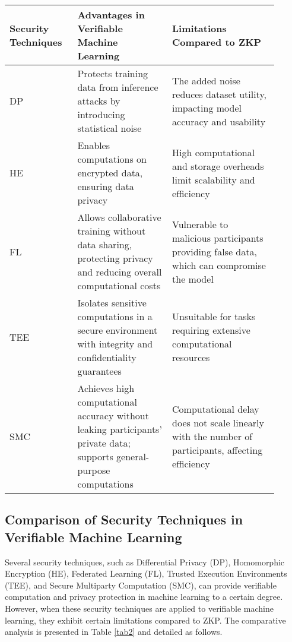 \documentclass[journal]{IEEEtran}
\begin{document}
\begin{table*}[ht]
\centering
\renewcommand{\arraystretch}{1.5} %
\setlength{\tabcolsep}{7pt} %
\caption{Comparison of Security Techniques in Verifiable Machine Learning}

\begin{center}
\begin{tabular}{p{0.22\linewidth} p{0.32\linewidth} p{0.36\linewidth}}
\hline
\textbf{Security Techniques} & \textbf{Advantages in Verifiable Machine Learning} & \textbf{Limitations Compared to ZKP} \\ \hline
DP \cite{dwork2006differential} & Protects training data from inference attacks by introducing statistical noise & The added noise reduces dataset utility, impacting model accuracy and usability \\ 
HE \cite{yi2014homomorphic} & Enables computations on encrypted data, ensuring data privacy & High computational and storage overheads limit scalability and efficiency \\ 
FL \cite{konevcny2016federated} & Allows collaborative training without data sharing, protecting privacy and reducing overall computational costs & Vulnerable to malicious participants providing false data, which can compromise the model \\ 
TEE \cite{sabt2015trusted} & Isolates sensitive computations in a secure environment with integrity and confidentiality guarantees & Unsuitable for tasks requiring extensive computational resources \\ 
SMC \cite{zhao2019secure} & Achieves high computational accuracy without leaking participants' private data; supports general-purpose computations & Computational delay does not scale linearly with the number of participants, affecting efficiency \\ 
\hline
\end{tabular}
\end{center}
\label{tab2}
\end{table*}



\subsection{Comparison of Security Techniques in Verifiable Machine Learning}\label{ss:2d}


Several security techniques, such as Differential Privacy (DP), Homomorphic Encryption (HE), Federated Learning (FL), Trusted Execution Environments (TEE), and Secure Multiparty Computation (SMC), can provide verifiable computation and privacy protection in machine learning to a certain degree. However, when these security techniques are applied to verifiable machine learning, they exhibit certain limitations compared to ZKP. The comparative analysis is presented in Table \ref{tab2} and detailed as follows. 
\end{document}
